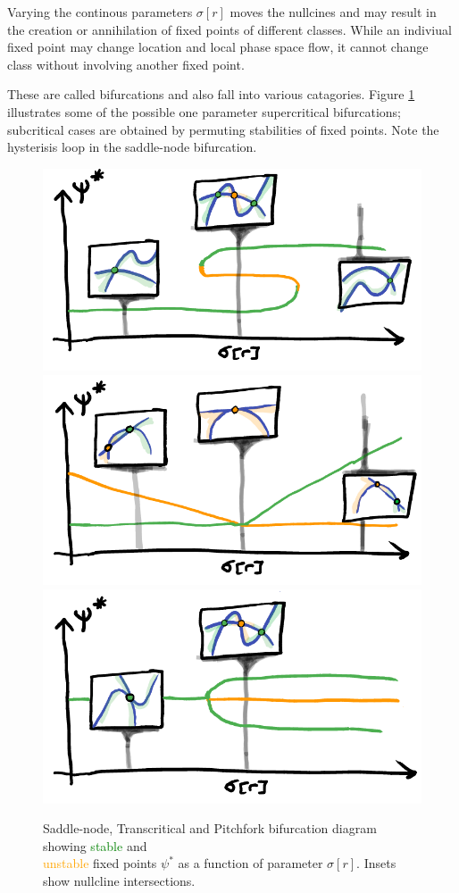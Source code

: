 \documentclass{article}[12pt]
\numberwithin{equation}{section}
\begin{document}
Varying the continous parameters $\sigma[r]$ moves the nullcines and may result in
the creation or annihilation of fixed points of different classes. While an indiviual
fixed point may change location and local phase space flow, it cannot change class
without involving another fixed point.

These are called bifurcations and also fall into various catagories.
Figure \ref{fig:bifurcations} illustrates some of the possible one parameter
supercritical bifurcations; subcritical cases are obtained by permuting
stabilities of fixed points. Note the hysterisis loop in the saddle-node
bifurcation.
\begin{figure}[H]
\centering{}
\captionsetup{justification=centering}
\includegraphics[scale=0.35]{figures/saddlenode}
\includegraphics[scale=0.35]{figures/transcritical}
\includegraphics[scale=0.35]{figures/pitchfork}
\caption{Saddle-node, Transcritical and Pitchfork bifurcation diagram showing
\textcolor{Green}{stable} and \\\textcolor{orange}{unstable} fixed points $\psi^*$
as a function of parameter $\sigma[r]$. Insets show nullcline intersections.}
\label{fig:bifurcations}
\end{figure}
\end{document}
